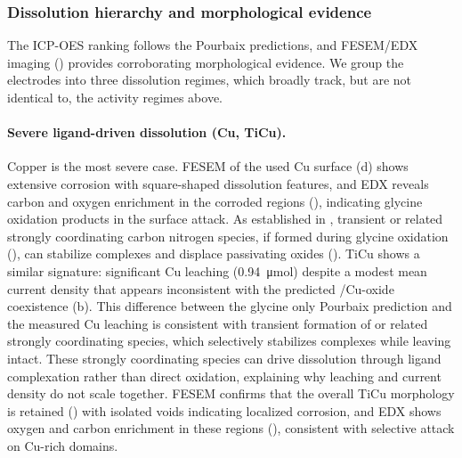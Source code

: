 \documentclass[twoside,twocolumn,9pt]{article}
\begin{document}
\subsubsection{Dissolution hierarchy and morphological evidence}

The ICP-OES ranking follows the Pourbaix predictions, and FESEM/EDX imaging () provides corroborating morphological evidence. We group the electrodes into three dissolution regimes, which broadly track, but are not identical to, the activity regimes above.

\paragraph{Severe ligand-driven dissolution (Cu, TiCu).}
Copper is the most severe case. FESEM of the used Cu surface (d) shows extensive corrosion with square-shaped dissolution features, and EDX reveals carbon and oxygen enrichment in the corroded regions (), indicating glycine oxidation products in the surface attack. As established in , transient  or related strongly coordinating carbon nitrogen species, if formed during glycine oxidation (), can stabilize  complexes and displace passivating oxides (). TiCu shows a similar signature: significant Cu leaching (0.94~\si{\micro mol}) despite a modest mean current density that appears inconsistent with the predicted /Cu-oxide coexistence (b). This difference between the glycine only Pourbaix prediction and the measured Cu leaching is consistent with transient formation of  or related strongly coordinating species, which selectively stabilizes  complexes while leaving  intact. These strongly coordinating species can drive dissolution through ligand complexation rather than direct oxidation, explaining why leaching and current density do not scale together. FESEM confirms that the overall TiCu morphology is retained () with isolated voids indicating localized corrosion, and EDX shows oxygen and carbon enrichment in these regions (), consistent with selective attack on Cu-rich domains.
\end{document}
